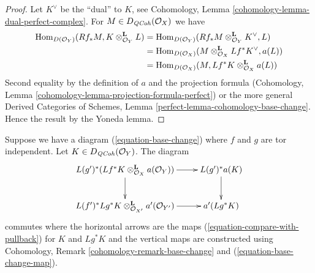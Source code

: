 \begin{proof}
Let $K^\vee$ be the ``dual'' to $K$, see
Cohomology, Lemma \ref{cohomology-lemma-dual-perfect-complex}.
For $M \in D_{\mathit{QCoh}}(\mathcal{O}_X)$ we have
\begin{align*}
\mathop{\mathrm{Hom}}\nolimits_{D(\mathcal{O}_Y)}(Rf_*M, K \otimes^\mathbf{L}_{\mathcal{O}_Y} L)
& =
\mathop{\mathrm{Hom}}\nolimits_{D(\mathcal{O}_Y)}(
Rf_*M \otimes^\mathbf{L}_{\mathcal{O}_Y} K^\vee, L) \\
& =
\mathop{\mathrm{Hom}}\nolimits_{D(\mathcal{O}_X)}(
M \otimes^\mathbf{L}_{\mathcal{O}_X} Lf^*K^\vee, a(L)) \\
& =
\mathop{\mathrm{Hom}}\nolimits_{D(\mathcal{O}_X)}(M,
Lf^*K \otimes^\mathbf{L}_{\mathcal{O}_X} a(L))
\end{align*}
Second equality by the definition of $a$ and the projection formula
(Cohomology, Lemma \ref{cohomology-lemma-projection-formula-perfect})
or the more general Derived Categories of Schemes, Lemma
\ref{perfect-lemma-cohomology-base-change}.
Hence the result by the Yoneda lemma.
\end{proof}

\begin{lemma}
\label{lemma-restriction-compare-with-pullback}
Suppose we have a diagram (\ref{equation-base-change}) where $f$ and $g$
are tor independent. Let $K \in D_{\mathit{QCoh}}(\mathcal{O}_Y)$. The diagram
$$
\xymatrix{
L(g')^*(Lf^*K \otimes^\mathbf{L}_{\mathcal{O}_X} a(\mathcal{O}_Y))
\ar[r] \ar[d] & L(g')^*a(K) \ar[d] \\
L(f')^*Lg^*K \otimes_{\mathcal{O}_{X'}}^\mathbf{L} a'(\mathcal{O}_{Y'})
\ar[r] & a'(Lg^*K)
}
$$
commutes where the horizontal arrows are the maps
(\ref{equation-compare-with-pullback}) for $K$ and $Lg^*K$
and the vertical maps are constructed using
Cohomology, Remark \ref{cohomology-remark-base-change} and
(\ref{equation-base-change-map}).
\end{lemma}

